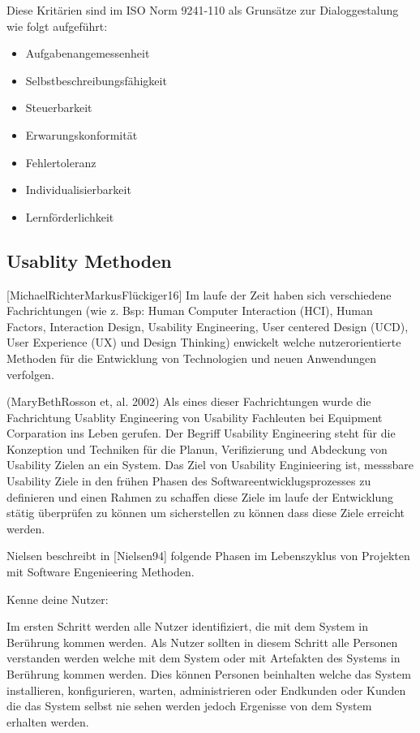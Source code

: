 Diese Kritärien sind im  ISO Norm  9241-110 als Grunsätze zur Dialoggestalung wie folgt aufgeführt: %

\begin{itemize}
	\item Aufgabenangemessenheit
	\item Selbstbeschreibungsfähigkeit
	\item Steuerbarkeit
	\item Erwarungskonformität
	\item Fehlertoleranz
	\item Individualisierbarkeit
	\item Lernförderlichkeit
\end{itemize}

\subsection{Usablity Methoden}

[MichaelRichterMarkusFlückiger16]  Im laufe der Zeit haben sich verschiedene Fachrichtungen (wie z. Bsp: Human Computer Interaction (HCI), Human Factors, Interaction Design, Usability Engineering, 
User centered Design (UCD), User Experience (UX) und Design Thinking)  enwickelt welche nutzerorientierte Methoden für die Entwicklung von Technologien und neuen Anwendungen verfolgen. 

(MaryBethRosson et, al. 2002) Als eines dieser Fachrichtungen wurde die Fachrichtung Usablity Engineering von Usability Fachleuten bei Equipment Corparation 
ins Leben gerufen.  Der Begriff Usability Engineering steht für die Konzeption und Techniken für die Planun, Verifizierung und Abdeckung von Usability Zielen an ein System.  
Das Ziel von Usability Enginieering ist, messsbare Usability Ziele in den frühen Phasen des Softwareentwicklugsprozesses zu definieren und einen Rahmen zu schaffen diese 
Ziele im laufe der Entwicklung stätig überprüfen zu können um sicherstellen zu können dass diese Ziele erreicht werden.

Nielsen beschreibt in [Nielsen94] folgende Phasen im Lebenszyklus von Projekten mit Software Engenieering Methoden.

Kenne deine Nutzer:  

Im ersten Schritt werden alle Nutzer identifiziert, die mit dem System in Berührung kommen werden. Als Nutzer sollten in diesem Schritt alle Personen 
verstanden werden welche mit dem System oder mit Artefakten des Systems in Berührung kommen werden. Dies können Personen beinhalten welche das 
System installieren, konfigurieren, warten, administrieren oder Endkunden oder Kunden die das System selbst nie sehen werden jedoch Ergenisse von dem System erhalten werden.  
 
